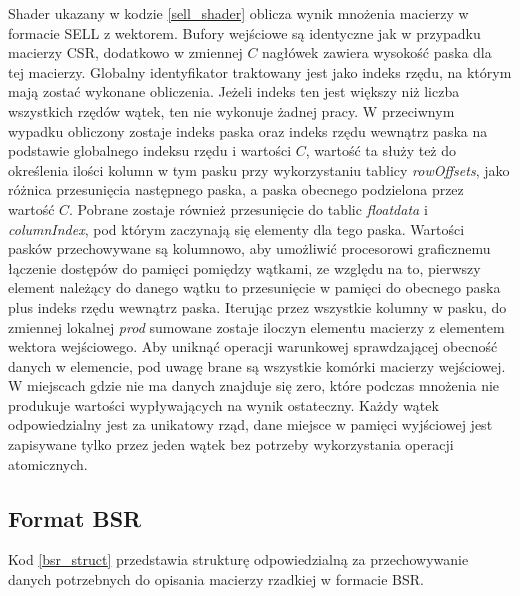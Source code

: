 Shader ukazany w kodzie \ref{sell_shader} oblicza wynik mnożenia macierzy w formacie SELL z wektorem.
Bufory wejściowe są identyczne jak w przypadku macierzy CSR, dodatkowo w zmiennej $C$ nagłówek zawiera wysokość paska dla tej macierzy.
Globalny identyfikator traktowany jest jako indeks rzędu, na którym mają zostać wykonane obliczenia.
Jeżeli indeks ten jest większy niż liczba wszystkich rzędów wątek, ten nie wykonuje żadnej pracy.
W przeciwnym wypadku obliczony zostaje indeks paska oraz indeks rzędu wewnątrz paska na podstawie globalnego indeksu rzędu i wartości $C$, wartość ta służy też  do określenia ilości kolumn w tym pasku przy wykorzystaniu tablicy \textit{rowOffsets}, jako różnica przesunięcia następnego paska, a paska obecnego podzielona przez wartość $C$.
Pobrane zostaje również przesunięcie do tablic \textit{floatdata} i \textit{columnIndex}, pod którym zaczynają się elementy dla tego paska.
Wartości pasków przechowywane są kolumnowo, aby umożliwić procesorowi graficznemu łączenie dostępów do pamięci pomiędzy wątkami, ze względu na to, pierwszy element należący do danego wątku to przesunięcie w pamięci do obecnego paska plus indeks rzędu wewnątrz paska.
Iterując przez wszystkie kolumny w pasku, do zmiennej lokalnej \textit{prod} sumowane zostaje iloczyn elementu macierzy z elementem wektora wejściowego.
Aby uniknąć operacji warunkowej sprawdzającej obecność danych w elemencie, pod uwagę brane są wszystkie komórki macierzy wejściowej. W miejscach gdzie nie ma danych znajduje się zero, które podczas mnożenia nie produkuje wartości wypływających na wynik ostateczny.
Każdy wątek odpowiedzialny jest za unikatowy rząd, dane miejsce w pamięci wyjściowej jest zapisywane tylko przez jeden wątek bez potrzeby wykorzystania operacji atomicznych.

\pagebreak

\subsection{Format BSR}
\label{cha:bsr_impl}

Kod \ref{bsr_struct} przedstawia strukturę odpowiedzialną za przechowywanie danych potrzebnych do opisania macierzy rzadkiej w formacie BSR.

